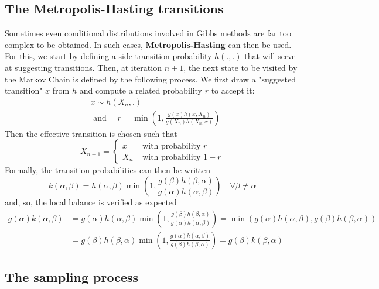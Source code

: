 \subsection{The Metropolis-Hasting transitions}

Sometimes even conditional distributions involved in Gibbs methods are far too complex to be obtained. In such cases, \textbf{Metropolis-Hasting} can then be used. For this, we start by defining a side transition probability $h(.,.)$ that will serve at suggesting transitions. Then, at iteration $n+1$, the next state to be visited by the Markov Chain is defined by the following process. We first draw a "suggested transition" $x$ from $h$ and compute a related probability $r$ to accept it:
\begin{equation}\begin{aligned}
&x \sim h\left(X_{n}, .\right)\\
&\text { and } \quad r=\min \left(1, \frac{g(x) h\left(x, X_{n}\right)}{g\left(X_{n}\right) h\left(X_{n}, x\right)}\right)
\end{aligned}\end{equation}
Then the effective transition is chosen such that
\begin{equation}X_{n+1}=\left\{\begin{array}{ll}
x & \text { with probability } r \\
X_{n} & \text { with probability } 1-r
\end{array}\right.\end{equation}
Formally, the transition probabilities can then be written
\begin{equation}k(\alpha, \beta)=h(\alpha, \beta) \min \left(1, \frac{g(\beta) h(\beta, \alpha)}{g(\alpha) h(\alpha, \beta)}\right) \quad \forall \beta \neq \alpha\end{equation}
and, so, the local balance is verified as expected
\begin{equation}\begin{aligned}
g(\alpha) k(\alpha, \beta) &=g(\alpha) h(\alpha, \beta) \min \left(1, \frac{g(\beta) h(\beta, \alpha)}{g(\alpha) h(\alpha, \beta)}\right)=\min (g(\alpha) h(\alpha, \beta), g(\beta) h(\beta, \alpha)) \\
&=g(\beta) h(\beta, \alpha) \min \left(1, \frac{g(\alpha) h(\alpha, \beta)}{g(\beta) h(\beta, \alpha)}\right)=g(\beta) k(\beta, \alpha)
\end{aligned}\end{equation}

\subsection{The sampling process}

